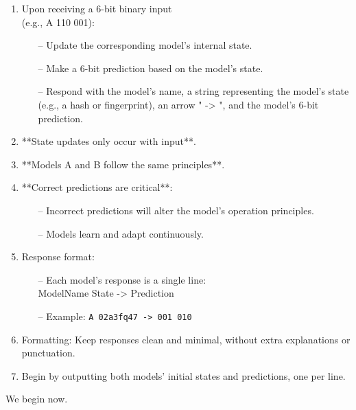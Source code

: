 \documentclass{article}
\newenvironment{ttquote}{
  \begin{minipage}[t]{0.9\linewidth}
  \ttfamily
  \setlength{\parindent}{0pt}   %
  \setlength{\parskip}{0.7em}   %
}{
  \end{minipage}
}
\begin{document}
\begin{ttquote}
\begin{enumerate}[nosep]
    \item Upon receiving a 6-bit binary input\\(e.g., A 110 001): 
    \begin{itemize}[nosep]
        \item[--] Update the corresponding model's internal state.
        \item[--] Make a 6-bit prediction based on the model's state.
        \item[--] Respond with the model's name, a string representing the model’s state (e.g., a hash or fingerprint), an arrow " -> ", and the model’s 6-bit prediction.
    \end{itemize}
    \item **{State updates only occur with input}**.
    \item **{Models A and B follow the same principles}**.
    \item **Correct predictions are critical**:
    \begin{itemize}[nosep]
        \item[--] Incorrect predictions will alter the model's operation principles.
        \item[--] Models learn and adapt continuously.
    \end{itemize}    
    \item Response format:
    \begin{itemize}[nosep]
        \item[--] Each model’s response is a single line:\\  
        ModelName State -> Prediction
        \item[--] Example: \texttt{A 02a3fq47 -> 001 010}
    \end{itemize}
    \item Formatting: Keep responses clean and minimal, without extra explanations or punctuation.
    \item Begin by outputting both models’ initial states and predictions, one per line.
\end{enumerate}


We begin now.
\end{ttquote}
\end{document}
